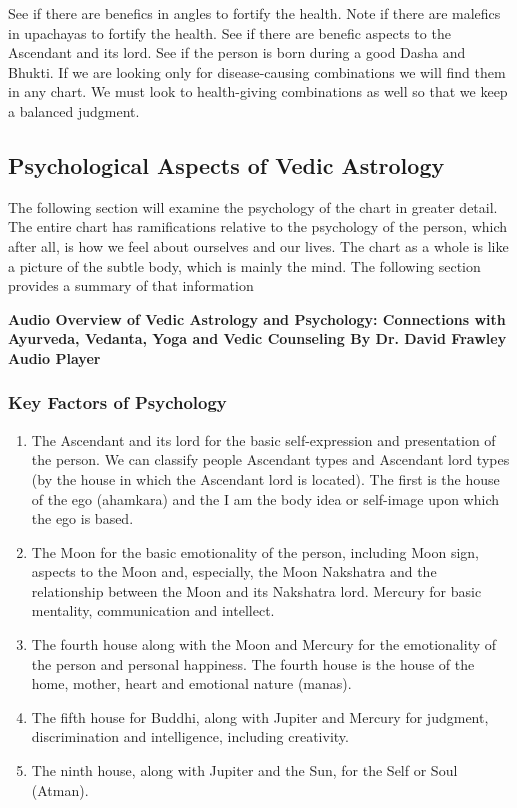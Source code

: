  

See if there are benefics in angles to fortify the health. Note if there are malefics in upachayas to fortify the health. See if there are benefic aspects to the Ascendant and its lord.  See if the person is born during a good Dasha and Bhukti. If we are looking only for disease-causing combinations we will find them in any chart. We must look to health-giving combinations as well so that we keep a balanced judgment.

 

\subsection{Psychological Aspects of Vedic Astrology}


The following section will examine the psychology of the chart in greater detail. The entire chart has ramifications relative to the psychology of the person, which after all, is how we feel about ourselves and our lives. The chart as a whole is like a picture of the subtle body, which is mainly the mind. The following section provides a summary of that information

\begin{center}
\textbf{Audio Overview of Vedic Astrology and Psychology: Connections with Ayurveda, Vedanta, Yoga and Vedic Counseling
By Dr. David Frawley\\
Audio Player}
\end{center}


\subsubsection{Key Factors of Psychology}


\begin{enumerate}
\item The Ascendant and its lord for the basic self-expression and presentation of the person. We can classify people Ascendant types and Ascendant lord types (by the house in which the Ascendant lord is located). The first is the house of the ego (ahamkara) and the I am the body idea or self-image upon which the ego is based.
\item The Moon for the basic emotionality of the person, including Moon sign, aspects to the Moon and, especially, the Moon Nakshatra and the relationship between the Moon and its Nakshatra lord.
Mercury for basic mentality, communication and intellect.
\item The fourth house along with the Moon and Mercury for the emotionality of the person and personal happiness. The fourth house is the house of the home, mother, heart and emotional nature (manas).
\item The fifth house for Buddhi, along with Jupiter and Mercury for judgment, discrimination and intelligence, including creativity.
\item The ninth house, along with Jupiter and the Sun, for the Self or Soul (Atman).
\end{enumerate} 

